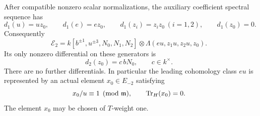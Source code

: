 \begin{proposition}
\label{coef:integral-lift}
After compatible nonzero scalar normalizations, the auxiliary
coefficient spectral sequence has
\[
 d_1(u)=uz_0,\qquad
 d_1(e)=ez_0,\qquad
 d_1(z_i)=z_i z_0\ (i=1,2),\qquad d_1(z_0)=0.
\]
Consequently
\begin{equation}\label{coef:second-page}
 \mathcal E_2
 =k[b^{\pm1},u^{\pm3},N_0,N_1,N_2]
       \otimes\Lambda(eu,z_1u,z_2u,z_0).
\end{equation}
Its only nonzero differential on these generators is
\[
 d_2(z_0)=c\,bN_0,\qquad c\in k^\times.
\]
There are no further differentials.  In particular the leading
cohomology class \(eu\) is represented by an actual element
\(x_0\in E_{-2}\) satisfying
\[
 x_0/u\equiv1\pmod{\mathfrak m},\qquad
 \operatorname{Tr}_H(x_0)=0.
\]
The element \(x_0\) may be chosen of \(T\)-weight one.
\end{proposition}


